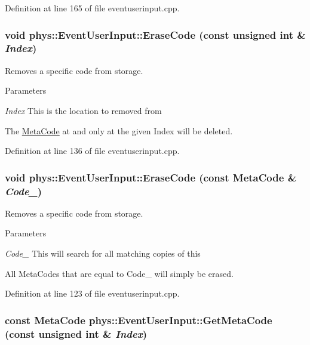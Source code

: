 Definition at line 165 of file eventuserinput.cpp.

\hypertarget{classphys_1_1EventUserInput_a583084578443019d6e286b8f0e02ce58}{
\subsubsection[{EraseCode}]{\setlength{\rightskip}{0pt plus 5cm}void phys::EventUserInput::EraseCode (const unsigned int \& {\em Index})}}
\label{d7/df5/classphys_1_1EventUserInput_a583084578443019d6e286b8f0e02ce58}


Removes a specific code from storage. 


\begin{DoxyParams}{Parameters}
\item[{\em Index}]This is the location to removed from\end{DoxyParams}
The \hyperlink{classphys_1_1MetaCode}{MetaCode} at and only at the given Index will be deleted. 

Definition at line 136 of file eventuserinput.cpp.

\hypertarget{classphys_1_1EventUserInput_a34c05a76a790435799441da75a83fa9c}{
\subsubsection[{EraseCode}]{\setlength{\rightskip}{0pt plus 5cm}void phys::EventUserInput::EraseCode (const {\bf MetaCode} \& {\em Code\_\-})}}
\label{d7/df5/classphys_1_1EventUserInput_a34c05a76a790435799441da75a83fa9c}


Removes a specific code from storage. 


\begin{DoxyParams}{Parameters}
\item[{\em Code\_\-}]This will search for all matching copies of this\end{DoxyParams}
All MetaCodes that are equal to Code\_\- will simply be erased. 

Definition at line 123 of file eventuserinput.cpp.

\hypertarget{classphys_1_1EventUserInput_aaf56168b98e339cec74ae862b64632ba}{
\subsubsection[{GetMetaCode}]{\setlength{\rightskip}{0pt plus 5cm}const {\bf MetaCode} phys::EventUserInput::GetMetaCode (const unsigned int \& {\em Index})}}
\label{d7/df5/classphys_1_1EventUserInput_aaf56168b98e339cec74ae862b64632ba}


